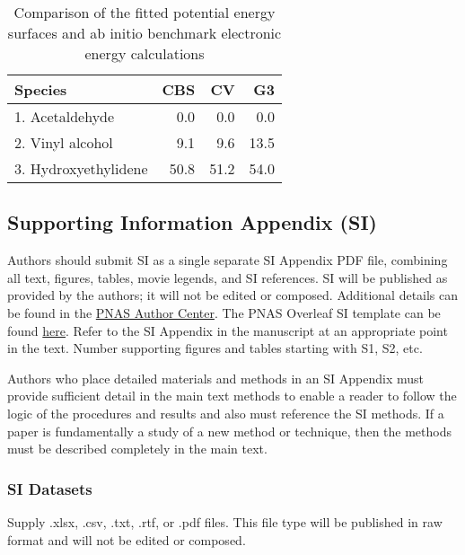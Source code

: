 \documentclass[9pt,twocolumn,twoside,lineno]{pnas-new}
\begin{document}
\begin{table}%
\centering
\caption{Comparison of the fitted potential energy surfaces and ab initio benchmark electronic energy calculations}
\begin{tabular}{lrrr}
Species & CBS & CV & G3 \\
\midrule
1. Acetaldehyde & 0.0 & 0.0 & 0.0 \\
2. Vinyl alcohol & 9.1 & 9.6 & 13.5 \\
3. Hydroxyethylidene & 50.8 & 51.2 & 54.0\\
\bottomrule
\end{tabular}

\end{table}

\subsection*{Supporting Information Appendix (SI)}

Authors should submit SI as a single separate SI Appendix PDF file, combining all text, figures, tables, movie legends, and SI references. SI will be published as provided by the authors; it will not be edited or composed. Additional details can be found in the \href{https://www.pnas.org/authors/submitting-your-manuscript#manuscript-formatting-guidelines}{PNAS Author Center}. The PNAS Overleaf SI template can be found \href{https://www.overleaf.com/latex/templates/pnas-template-for-supplementary-information/wqfsfqwyjtsd}{here}. Refer to the SI Appendix in the manuscript at an appropriate point in the text. Number supporting figures and tables starting with S1, S2, etc.

Authors who place detailed materials and methods in an SI Appendix must provide sufficient detail in the main text methods to enable a reader to follow the logic of the procedures and results and also must reference the SI methods. If a paper is fundamentally a study of a new method or technique, then the methods must be described completely in the main text.

\subsubsection*{SI Datasets} 

Supply .xlsx, .csv, .txt, .rtf, or .pdf files. This file type will be published in raw format and will not be edited or composed.
\end{document}
